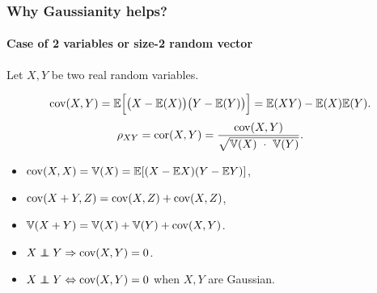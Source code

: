 \begin{frame}
  \frametitle{Why Gaussianity helps?}
  \framesubtitle{Case of 2 variables or size-2 random vector}

  Let $X,Y$ be two real random variables.
  
  \begin{definitions}
    \vspace{-.55cm}
    \begin{equation*}
      \mathrm{cov}(X,Y)   =  \mathbb{E}\Big[\big(X-\mathbb{E}(X)\big)\big(Y-\mathbb{E}(Y)\big)\Big]  =
      \mathbb{E}(XY) - \mathbb{E}(X)\mathbb{E}(Y).
    \end{equation*}
    \begin{equation*}
      \rho_{XY} = \mathrm{cor}(X,Y) = \frac{\mathrm{cov}(X,Y)}{\sqrt{\mathbb{V}(X) \ \cdot \ \mathbb{V}(Y)}}.
    \end{equation*}
  \end{definitions}
  
  \begin{proposition}
    \begin{itemize}
    \item $\mathrm{cov}(X,X) = \mathbb{V}(X) = \mathbb{E}[(X-\mathbb{E} X)(Y-\mathbb{E} Y)]$,
    \item $\mathrm{cov}(X+Y,Z) = \mathrm{cov}(X,Z) + \mathrm{cov}(X,Z)$,
    \item $\mathbb{V}(X+Y) = \mathbb{V}(X) + \mathbb{V}(Y) + \mathrm{cov}(X,Y)$.
    \item $X \indep Y \Rightarrow\cov(X,Y) = 0$.
    \item \alert{$X  \indep Y  \Leftrightarrow \cov(X,Y) =  0$ when
        $X,Y$ are Gaussian}.
    \end{itemize}
  \end{proposition}
\end{frame}

